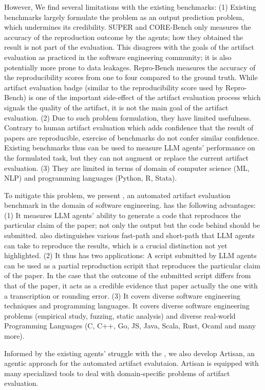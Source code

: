 However, We find several limitations with the existing benchmarks:
(1) Existing benchmarks largely formulate the problem as an output prediction problem, which undermines its credibility.
SUPER and CORE-Bench only measures the accuracy of the reproduction outcome by the agents; how they obtained the result is not part of the evaluation.
This disagrees with the goals of the artifact evaluation as practiced in the software engineering community; it is also potentially more prone to data leakages.
Repro-Bench measures the accuracy of the reproducibility scores from one to four compared to the ground truth.
While artifact evaluation badge (similar to the reproducibility score used by Repro-Bench) is one of the important side-effect of the artifact evaluation process which signals the quality of the artifact, it is not the main goal of the artifact evaluation.
(2) Due to such problem formulation, they have limited usefulness.
Contrary to human artifact evaluation which adds confidence that the result of papers are reproducible, exercise of benchmarks do not confer similar confidence.
Existing benchmarks thus can be used to measure LLM agents' performance on the formulated task, but they can not augment or replace the current artifact evaluation.
(3) They are limited in terms of domain of computer science (ML, NLP) and programming languages (Python, R, Stata).

To mitigate this problem, we present \benchmark, an automated artifact evaluation benchmark in the domain of software engineering.
\benchmark has the following advantages:
(1) It measures LLM agents' ability to generate a code that reproduces the particular claim of the paper; not only the output but the code behind should be submitted.
\benchmark also distinguishes various fast-path and short-path that LLM agents can take to reproduce the results, which is a crucial distinction not yet highlighted.
(2) It thus has two applications:
A script submitted by LLM agents can be used as a partial reproduction scripit that reproduces the particular claim of the paper.
In the case that the outcome of the submitted script differs from that of the paper, it acts as a credible evidence that paper actually the one with a transcription or rounding error.
(3) It covers diverse software engineering techniques and programming languages.
It covers diverse software engineering problems (empirical study, fuzzing, static analysis) and diverse real-world Programming Languages (C, C++, Go, JS, Java, Scala, Rust, Ocaml and many more).

Informed by the existing agents' struggle with the \benchmark, we also develop Artisan, an agentic approach for the automated artifact evalutaion.
Artisan is equipped with many specialized tools to deal with domain-specific problems of artifact evaluation.

